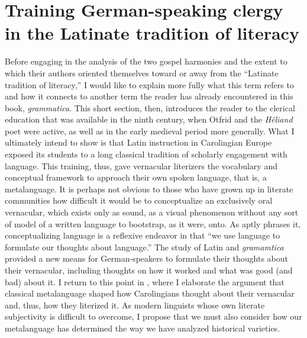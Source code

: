 \section{Training German-speaking clergy in the Latinate tradition of literacy}\label{sec:5.1}

Before engaging in the analysis of the two gospel harmonies and the extent to which their authors oriented themselves toward or away from the “Latinate tradition of literacy,” I would like to explain more fully what this term refers to and how it connects to another term the reader has already encountered in this book, \textit{grammatica}. This short section, then, introduces the reader to the clerical education that was available in the ninth century, when Otfrid and the \textit{Hêliand} poet were active, as well as in the early medieval period more generally. What I ultimately intend to show is that Latin instruction in Carolingian Europe exposed its students to a long classical tradition of scholarly engagement with language. This training, thus, gave vernacular literizers the vocabulary and conceptual framework to approach their own spoken language, that is, a metalanguage. It is perhaps not obvious to those who have grown up in literate communities how difficult it would be to conceptualize an exclusively oral vernacular, which exists only as sound, as a visual phenomenon without any sort of model of a written language to bootstrap, as it were, onto. As \citet[250]{Law1997} aptly phrases it, conceptualizing language is a reflexive endeavor in that “we use language to formulate our thoughts about language.” The study of Latin and \textit{gramamtica} provided a new means for German-speakers to formulate their thoughts about their vernacular, including thoughts on how it worked and what was good (and bad) about it. I return to this point in , where I elaborate the argument that classical metalanguage shaped how Carolingians thought about their vernacular and, thus, how they literized it. As modern linguists whose own literate subjectivity is difficult to overcome, I propose that we must also consider how our metalanguage has determined the way we have analyzed historical varieties.

